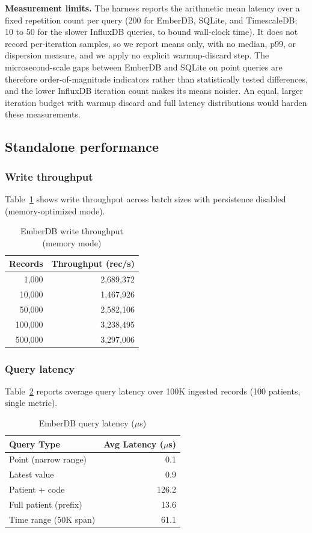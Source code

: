 \documentclass[journal]{IEEEtran}
\begin{document}
\textbf{Measurement limits.} The harness reports the arithmetic mean latency over a fixed repetition count per query (200 for EmberDB, SQLite, and TimescaleDB; 10 to 50 for the slower InfluxDB queries, to bound wall-clock time). It does not record per-iteration samples, so we report means only, with no median, p99, or dispersion measure, and we apply no explicit warmup-discard step. The microsecond-scale gaps between EmberDB and SQLite on point queries are therefore order-of-magnitude indicators rather than statistically tested differences, and the lower InfluxDB iteration count makes its means noisier. An equal, larger iteration budget with warmup discard and full latency distributions would harden these measurements.

\subsection{Standalone performance}

\subsubsection{Write throughput}
Table~\ref{tab:write} shows write throughput across batch sizes with persistence disabled (memory-optimized mode).

\begin{table}[htbp]
\centering
\caption{EmberDB write throughput (memory mode)}
\label{tab:write}
\begin{tabular}{rr}
\toprule
\textbf{Records} & \textbf{Throughput (rec/s)} \\
\midrule
1{,}000 & 2{,}689{,}372 \\
10{,}000 & 1{,}467{,}926 \\
50{,}000 & 2{,}582{,}106 \\
100{,}000 & 3{,}238{,}495 \\
500{,}000 & 3{,}297{,}006 \\
\bottomrule
\end{tabular}
\end{table}

\subsubsection{Query latency}
Table~\ref{tab:query} reports average query latency over 100K ingested records (100 patients, single metric).

\begin{table}[htbp]
\centering
\caption{EmberDB query latency ($\mu$s)}
\label{tab:query}
\begin{tabular}{lr}
\toprule
\textbf{Query Type} & \textbf{Avg Latency ($\mu$s)} \\
\midrule
Point (narrow range) & 0.1 \\
Latest value & 0.9 \\
Patient + code & 126.2 \\
Full patient (prefix) & 13.6 \\
Time range (50K span) & 61.1 \\
\bottomrule
\end{tabular}
\end{table}
\end{document}
